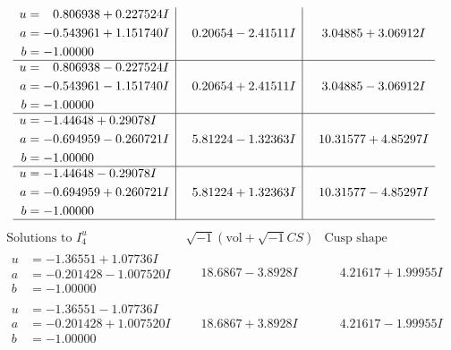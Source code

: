 \documentclass[1p]{elsarticle_modified}
\theoremstyle{definition}
\newcommand{\I}{\sqrt{-1}}
\begin{document}
$$\begin{array}{c|c|c}
\begin{aligned}
u &= \phantom{-}0.806938 + 0.227524 I \\
a &= -0.543961 + 1.151740 I \\
b &= -1.00000\phantom{ +0.000000I}\end{aligned}
 & \phantom{-}0.20654 - 2.41511 I & \phantom{-}3.04885 + 3.06912 I \\ \hline\begin{aligned}
u &= \phantom{-}0.806938 - 0.227524 I \\
a &= -0.543961 - 1.151740 I \\
b &= -1.00000\phantom{ +0.000000I}\end{aligned}
 & \phantom{-}0.20654 + 2.41511 I & \phantom{-}3.04885 - 3.06912 I \\ \hline\begin{aligned}
u &= -1.44648 + 0.29078 I \\
a &= -0.694959 - 0.260721 I \\
b &= -1.00000\phantom{ +0.000000I}\end{aligned}
 & \phantom{-}5.81224 - 1.32363 I & \phantom{-}10.31577 + 4.85297 I \\ \hline\begin{aligned}
u &= -1.44648 - 0.29078 I \\
a &= -0.694959 + 0.260721 I \\
b &= -1.00000\phantom{ +0.000000I}\end{aligned}
 & \phantom{-}5.81224 + 1.32363 I & \phantom{-}10.31577 - 4.85297 I\\
 \hline 
 \end{array}$$\newpage$$\begin{array}{c|c|c}  
\text{Solutions to }I^u_{4}& \I (\text{vol} + \sqrt{-1}CS) & \text{Cusp shape}\\
 \hline 
\begin{aligned}
u &= -1.36551 + 1.07736 I \\
a &= -0.201428 - 1.007520 I \\
b &= -1.00000\phantom{ +0.000000I}\end{aligned}
 & \phantom{-}18.6867 - 3.8928 I & \phantom{-}4.21617 + 1.99955 I \\ \hline\begin{aligned}
u &= -1.36551 - 1.07736 I \\
a &= -0.201428 + 1.007520 I \\
b &= -1.00000\phantom{ +0.000000I}\end{aligned}
 & \phantom{-}18.6867 + 3.8928 I & \phantom{-}4.21617 - 1.99955 I \\ \hline\begin{aligned}

\end{aligned}
\end{array}$$
\end{document}
